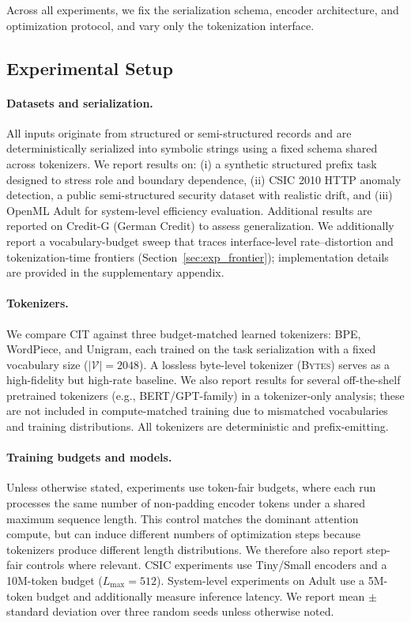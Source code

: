Across all experiments, we fix the serialization schema, encoder architecture, and optimization protocol, and vary only the tokenization interface.

\subsection{Experimental Setup}
\label{sec:exp_protocol}

\paragraph{Datasets and serialization.}
All inputs originate from structured or semi-structured records and are deterministically serialized into symbolic strings using a fixed schema shared across tokenizers.
We report results on:
(i) a synthetic structured prefix task designed to stress role and boundary dependence,
(ii) CSIC 2010 HTTP anomaly detection, a public semi-structured security dataset with realistic drift,
and (iii) OpenML Adult for system-level efficiency evaluation.
Additional results are reported on Credit-G (German Credit) to assess generalization.
We additionally report a vocabulary-budget sweep that traces interface-level rate--distortion and tokenization-time frontiers (Section~\ref{sec:exp_frontier}); implementation details are provided in the supplementary appendix.

\paragraph{Tokenizers.}
We compare CIT against three budget-matched learned tokenizers: BPE, WordPiece, and Unigram, each trained on the task serialization with a fixed vocabulary size ($|\mathcal{V}|=2048$).
A lossless byte-level tokenizer (\textsc{Bytes}) serves as a high-fidelity but high-rate baseline.
We also report results for several off-the-shelf pretrained tokenizers (e.g., BERT/GPT-family) in a tokenizer-only analysis; these are not included in compute-matched training due to mismatched vocabularies and training distributions.
All tokenizers are deterministic and prefix-emitting.

\paragraph{Training budgets and models.}
Unless otherwise stated, experiments use token-fair budgets, where each run processes the same number of non-padding encoder tokens under a shared maximum sequence length.
This control matches the dominant attention compute, but can induce different numbers of optimization steps because tokenizers produce different length distributions.
We therefore also report step-fair controls where relevant.
CSIC experiments use Tiny/Small encoders and a 10M-token budget ($L_{\max}=512$).
System-level experiments on Adult use a 5M-token budget and additionally measure inference latency.
We report mean $\pm$ standard deviation over three random seeds unless otherwise noted.

